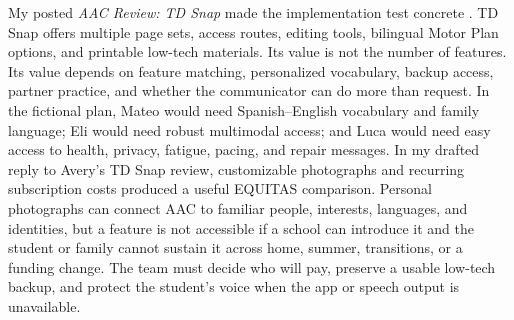 My posted \textit{AAC Review: TD Snap} made the implementation test concrete \citep{garciabautista2026tdsnap}. TD Snap offers multiple page sets, access routes, editing tools, bilingual Motor Plan options, and printable low-tech materials. Its value is not the number of features. Its value depends on feature matching, personalized vocabulary, backup access, partner practice, and whether the communicator can do more than request. In the fictional plan, Mateo would need Spanish--English vocabulary and family language; Eli would need robust multimodal access; and Luca would need easy access to health, privacy, fatigue, pacing, and repair messages. In my drafted reply to Avery's TD Snap review, customizable photographs and recurring subscription costs produced a useful EQUITAS comparison. Personal photographs can connect AAC to familiar people, interests, languages, and identities, but a feature is not accessible if a school can introduce it and the student or family cannot sustain it across home, summer, transitions, or a funding change. The team must decide who will pay, preserve a usable low-tech backup, and protect the student's voice when the app or speech output is unavailable.

